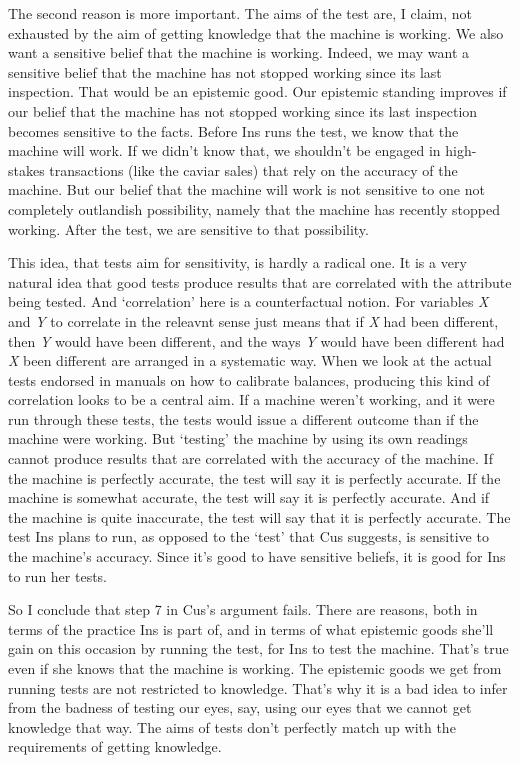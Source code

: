 The second reason is more important. The aims of the test are, I claim, not exhausted by the aim of getting knowledge that the machine is working. We also want a sensitive belief that the machine is working. Indeed, we may want a sensitive belief that the machine has not stopped working since its last inspection. That would be an epistemic good. Our epistemic standing improves if our belief that the machine has not stopped working since its last inspection becomes sensitive to the facts. Before \gls{Ins} runs the test, we know that the machine will work. If we didn't know that, we shouldn't be engaged in high-stakes transactions (like the caviar sales) that rely on the accuracy of the machine. But our belief that the machine will work is not sensitive to one not completely outlandish possibility, namely that the machine has recently stopped working. After the test, we are sensitive to that possibility.

This idea, that tests aim for sensitivity, is hardly a radical one. It is a very natural idea that good tests produce results that are correlated with the attribute being tested. And `correlation' here is a counterfactual notion. For variables \emph{X} and \emph{Y} to correlate in the releavnt sense just means that if \emph{X} had been different, then \emph{Y} would have been different, and the ways \emph{Y} would have been different had \emph{X} been different are arranged in a systematic way. When we look at the actual tests endorsed in manuals on how to calibrate balances, producing this kind of correlation looks to be a central aim. If a machine weren't working, and it were run through these tests, the tests would issue a different outcome than if the machine were working. But `testing' the machine by using its own readings cannot produce results that are correlated with the accuracy of the machine. If the machine is perfectly accurate, the test will say it is perfectly accurate. If the machine is somewhat accurate, the test will say it is perfectly accurate. And if the machine is quite inaccurate, the test will say that it is perfectly accurate. The test \gls{Ins} plans to run, as opposed to the `test' that \gls{Cus} suggests, is sensitive to the machine's accuracy. Since it's good to have sensitive beliefs, it is good for \gls{Ins} to run her tests.

So I conclude that step 7 in \gls{Cus}'s argument fails. There are reasons, both in terms of the practice \gls{Ins} is part of, and in terms of what epistemic goods she'll gain on this occasion by running the test, for \gls{Ins} to test the machine. That's true even if she knows that the machine is working. The epistemic goods we get from running tests are not restricted to knowledge. That's why it is a bad idea to infer from the badness of testing our eyes, say, using our eyes that we cannot get knowledge that way. The aims of tests don't perfectly match up with the requirements of getting knowledge.

